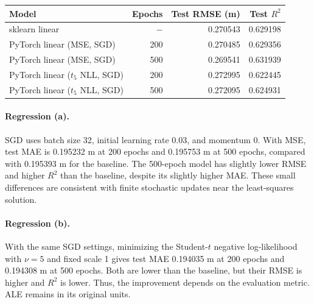 \begin{center}
  \begin{tabular}{lrrr}
    \hline
    Model & Epochs & Test RMSE (m) & Test $R^2$ \\
    \hline
    sklearn linear & $-$ & 0.270543 & 0.629198 \\
    PyTorch linear (MSE, SGD) & 200 & 0.270485 & 0.629356 \\
    PyTorch linear (MSE, SGD) & 500 & 0.269541 & 0.631939 \\
    PyTorch linear ($t_5$ NLL, SGD) & 200 & 0.272995 & 0.622445 \\
    PyTorch linear ($t_5$ NLL, SGD) & 500 & 0.272095 & 0.624931 \\
    \hline
  \end{tabular}
\end{center}

\paragraph{Regression (a).} SGD uses batch size 32, initial learning rate 0.03, and momentum 0. With MSE, test MAE is 0.195232 m at 200 epochs and 0.195753 m at 500 epochs, compared with 0.195393 m for the baseline. The 500-epoch model has slightly lower RMSE and higher $R^2$ than the baseline, despite its slightly higher MAE. These small differences are consistent with finite stochastic updates near the least-squares solution.

\paragraph{Regression (b).} With the same SGD settings, minimizing the Student-$t$ negative log-likelihood with $\nu=5$ and fixed scale 1 gives test MAE 0.194035 m at 200 epochs and 0.194308 m at 500 epochs. Both are lower than the baseline, but their RMSE is higher and $R^2$ is lower. Thus, the improvement depends on the evaluation metric. ALE remains in its original units.
